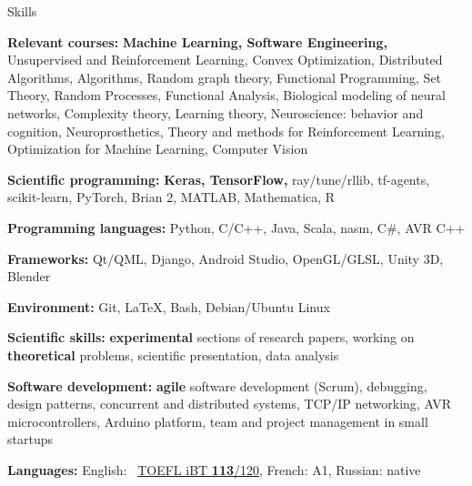 \documentclass{resume} %
\newcommand*{\img}[1]{%
	\raisebox{-.02\baselineskip}{%
		\texttt{[image: \#1]}%
	}%
}
\newcommand*{\emoji}[1]{\img{./emoji/#1.png}}
\newcommand{\mylink}{{\color{gray}\faExternalLink}}
\begin{document}
\begin{rSection}{Skills}
	\vspace{-1em}
	\item {\color{grayheading}\bf Relevant courses:} {\bf Machine Learning, Software Engineering,} {\small Unsupervised and Reinforcement Learning, Convex Optimization, Distributed Algorithms, Algorithms, Random graph theory, Functional Programming, Set Theory, Random Processes, Functional Analysis, Biological modeling of neural networks, Complexity theory, Learning theory, Neuroscience: behavior and cognition, Neuroprosthetics, Theory and methods for Reinforcement Learning, Optimization for Machine Learning, Computer Vision}
	\item {\color{grayheading}\bf Scientific programming:} {\bf Keras, TensorFlow,} ray/tune/rllib, tf-agents, scikit-learn, PyTorch, Brian 2, MATLAB, Mathematica, R
	\item {\color{grayheading}\bf Programming languages:} Python, C/C++, Java, {\small Scala, nasm, C\#, AVR C++}
	\item {\color{grayheading}\bf Frameworks:} Qt/QML, Django, {\small Android Studio, OpenGL/GLSL, Unity 3D, Blender}
	\item {\color{grayheading}\bf Environment:} Git, \LaTeX, Bash, Debian/Ubuntu Linux
	\item {\color{grayheading}\bf Scientific skills:} {\bf experimental} sections of research papers, working on {\bf theoretical} problems, scientific presentation, data analysis
	\item {\color{grayheading}\bf Software development:} {\bf agile} software development (Scrum), debugging, design patterns, concurrent and distributed systems, {\small TCP/IP networking, AVR microcontrollers, Arduino platform, team and project management in small startups}
	\item {\color{grayheading}\bf Languages:} \emoji{flag-us} English: \mylink~\href{https://sergia-ch.github.io/epfl/TOEFL.pdf}{TOEFL iBT {\bf 113}/120}, {\small \emoji{flag-fr} French: A1, \emoji{flag-ru} Russian: native}
\end{rSection}
\end{document}
